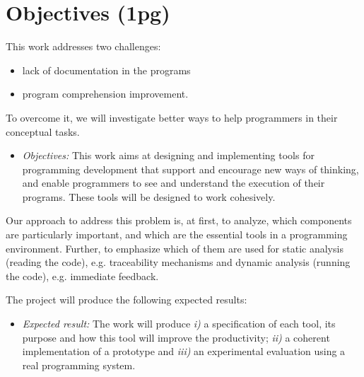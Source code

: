 
% 
% 

\section{Objectives (1pg)}
\label{sec:obj}

This work addresses two challenges:
\begin{itemize}
\item lack of documentation in the programs
\item program comprehension improvement.
\end{itemize}

To overcome it, we will investigate better ways to help programmers in their conceptual tasks. 

\begin{itemize}
\item[] \textit{Objectives:} This work aims at designing and implementing tools for programming development that support and encourage new ways of thinking, and enable programmers to see and understand the execution of their programs. These tools will be designed to work cohesively. 
\end{itemize}

Our approach to address this problem is, at first, to analyze, which components are particularly important, and which are the essential tools in a programming environment. Further, to emphasize which of them are used for static analysis (reading the code), e.g. traceability mechanisms and dynamic analysis (running the code), e.g. immediate feedback. 

The project will produce the following expected results:
 
\begin{itemize}
\item[] \textit{Expected result:}  The work will produce \textit{i)} a specification of each tool, its purpose and how this tool will improve the productivity; \textit{ii)} a coherent implementation of a prototype and \textit{iii)} an experimental evaluation using a real programming system.
\end{itemize}
